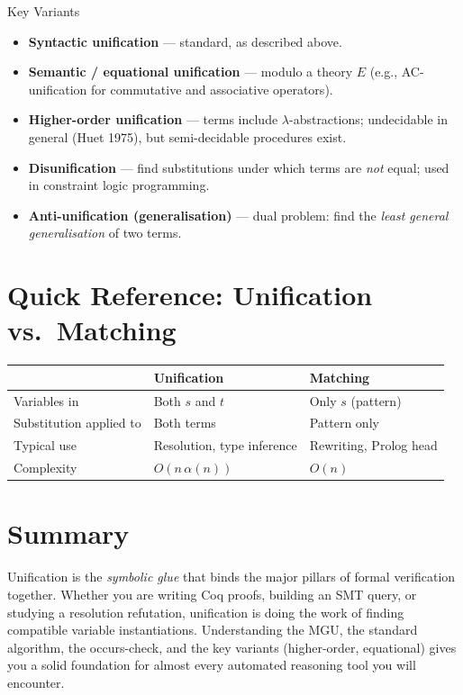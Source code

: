 \documentclass[11pt, a4paper]{article}
\begin{document}
\begin{defbox}{Key Variants}
\begin{itemize}[leftmargin=*, itemsep=4pt]
    \item \textbf{Syntactic unification} — standard, as described above.
    \item \textbf{Semantic / equational unification} — modulo a theory $E$
          (e.g., AC-unification for commutative and associative operators).
    \item \textbf{Higher-order unification} — terms include $\lambda$-abstractions;
          undecidable in general (Huet 1975), but semi-decidable procedures exist.
    \item \textbf{Disunification} — find substitutions under which terms are
          \emph{not} equal; used in constraint logic programming.
    \item \textbf{Anti-unification (generalisation)} — dual problem: find the
          \emph{least general generalisation} of two terms.
\end{itemize}
\end{defbox}
 
\section{Quick Reference: Unification vs.\ Matching}
 
\begin{center}
\renewcommand{\arraystretch}{1.3}
\begin{tabular}{lll}
\toprule
 & \textbf{Unification} & \textbf{Matching} \\
\midrule
Variables in & Both $s$ and $t$ & Only $s$ (pattern) \\
Substitution applied to & Both terms & Pattern only \\
Typical use & Resolution, type inference & Rewriting, Prolog head \\
Complexity & $O(n\,\alpha(n))$ & $O(n)$ \\
\bottomrule
\end{tabular}
\end{center}
 
\section{Summary}
 
Unification is the \emph{symbolic glue} that binds the major pillars of formal
verification together. Whether you are writing Coq proofs, building an SMT query,
or studying a resolution refutation, unification is doing the work of finding
compatible variable instantiations. Understanding the MGU, the standard algorithm,
the occurs-check, and the key variants (higher-order, equational) gives you a solid
foundation for almost every automated reasoning tool you will encounter.
 
\end{document}
